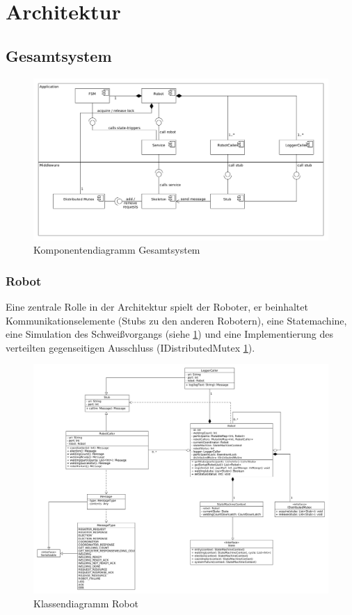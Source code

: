 \section{Architektur}

\subsection{Gesamtsystem}

\begin{figure}[h]
 \includegraphics[width=\textwidth]{../diagrams/2_gesamtsystem.png}
 \caption{Komponentendiagramm Gesamtsystem}
 \label{fig:gesamtsystem}
\end{figure}

\subsubsection{Robot}

Eine zentrale Rolle in der Architektur spielt der Roboter, er beinhaltet Kommunikationselemente (Stubs 
\citep{tanenbaumvansteen} zu den anderen Robotern), eine Statemachine, eine Simulation des
Schweißvorgangs (siehe \ref{fig:gesamtsystem}) und eine Implementierung des verteilten gegenseitigen
Ausschluss (IDistributedMutex \ref{fig:gesamtsystem}).

\clearpage

\begin{figure}[h]
 \includegraphics[width=\textwidth]{../diagrams/3_robot_klassendiagramm.png}
 \caption{Klassendiagramm Robot}
 \label{fig:class_robot}
\end{figure}

